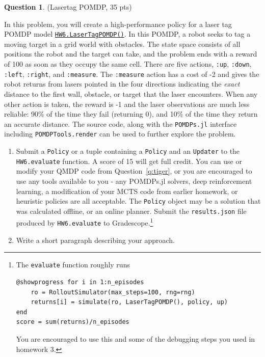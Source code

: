 \documentclass{article}
\theoremstyle{definition}
\newtheorem{question}[thm]{Question}
\begin{document}
\begin{question}
    (Lasertag POMDP, 35 pts)
    
    In this problem, you will create a high-performance policy for a laser tag POMDP model \href{https://github.com/zsunberg/DMUStudent.jl/blob/master/src/HW6.jl#L20-L268}{\texttt{HW6.LaserTagPOMDP()}}.  In this POMDP, a robot seeks to tag a moving target in a grid world with obstacles. The state space consists of all positions the robot and the target can take, and the problem ends with a reward of 100 as soon as they occupy the same cell. There are five actions, \texttt{:up}, \texttt{:down}, \texttt{:left}, \texttt{:right}, and \texttt{:measure}. The \texttt{:measure} action has a cost of -2 and gives the robot returns from lasers pointed in the four directions indicating the \emph{exact} distance to the first wall, obstacle, or target that the laser encounters. When any other action is taken, the reward is -1 and the laser observations are much less reliable: 90\% of the time they fail (returning 0), and 10\% of the time they return an accurate distance. The source code, along with the \texttt{POMDPs.jl} interface including \texttt{POMDPTools.render} can be used to further explore the problem.

    \begin{enumerate}[label=\alph*)]
        \item Submit a \texttt{Policy} or a tuple containing a \texttt{Policy} and an \texttt{Updater} to the \texttt{HW6.evaluate} function. A score of 15 will get full credit. You can use or modify your QMDP code from Question~\ref{q:tiger}, or you are encouraged to use any tools available to you - any POMDPs.jl solvers, deep reinforcement learning, a modification of your MCTS code from earlier homework, or heuristic policies are all acceptable. The \texttt{Policy} object may be a solution that was calculated offline, or an online planner. {\color{purple} Submit the \texttt{results.json} file produced by \texttt{HW6.evaluate} to Gradescope.}\footnote{\color{purple} The \texttt{evaluate} function roughly runs
\begin{verbatim}
@showprogress for i in 1:n_episodes
    ro = RolloutSimulator(max_steps=100, rng=rng)
    returns[i] = simulate(ro, LaserTagPOMDP(), policy, up)
end
score = sum(returns)/n_episodes
\end{verbatim}
You are encouraged to use this and some of the debugging steps you used in homework 3.}
        \item Write a short paragraph describing your approach.
    \end{enumerate}
\end{question}
\end{document}
